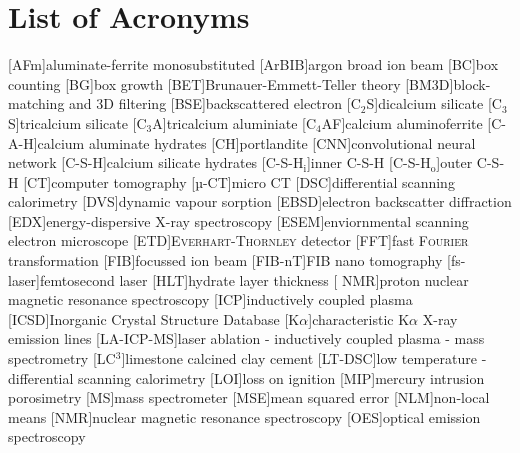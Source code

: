 \chapter{List of Acronyms}

\begin{acronym}[LA-ICP-MS]\itemsep=0pt

	[AFm]{aluminate-ferrite monosubstituted}
	[ArBIB]{argon broad ion beam}
	[BC]{box counting}
	[BG]{box growth}
	[BET]{Brunauer-Emmett-Teller theory}%
	[BM3D]{block-matching and 3D filtering}
	[BSE]{backscattered electron}
	[C$_2$S]{dicalcium silicate}
	[C$_3$S]{tricalcium silicate}
	[C$_3$A]{tricalcium aluminiate}
	[C$_4$AF]{calcium aluminoferrite}
	[C\hbox{-}A\hbox{-}H\xspace]{calcium aluminate hydrates}
	[CH]{portlandite}
	[CNN]{convolutional neural network}
	[C\hbox{-}S\hbox{-}H\xspace]{calcium silicate hydrates}
	[C-S-H$_\text{i}$]{inner C\hbox{-}S\hbox{-}H}
	[C-S-H$_\text{o}$]{outer C\hbox{-}S\hbox{-}H}
	[CT]{computer tomography}
	[µ-CT]{micro CT}
	[DSC]{differential scanning calorimetry}
	[DVS]{dynamic vapour sorption}
	[EBSD]{electron backscatter diffraction}
	[EDX]{energy-dispersive X-ray spectroscopy}
	[ESEM]{enviornmental scanning electron microscope}
	[ETD]{\textsc{Everhart}-\textsc{Thornley} detector}
	[FFT]{fast \textsc{Fourier} transformation}
	[FIB]{focussed ion beam}
	[FIB-nT]{FIB nano tomography}
	[fs-laser]{femtosecond laser}
	[HLT]{hydrate layer thickness}
	[ NMR]{proton nuclear magnetic resonance spectroscopy}
	[ICP]{inductively coupled plasma}
	[ICSD]{Inorganic Crystal Structure Database}
	[K$\alpha$]{characteristic K$\alpha$ X-ray emission lines}
	[LA-ICP-MS]{laser ablation - inductively coupled plasma - mass spectrometry}
	[LC$^3$]{limestone calcined clay cement} %
	[LT-DSC]{low temperature - differential scanning calorimetry}
	[LOI]{loss on ignition}
	[MIP]{mercury intrusion porosimetry}
	[MS]{mass spectrometer}
	[MSE]{mean squared error}
	[NLM]{non-local means}
	[NMR]{nuclear magnetic resonance spectroscopy}
	[OES]{optical emission spectroscopy}

\end{acronym}
